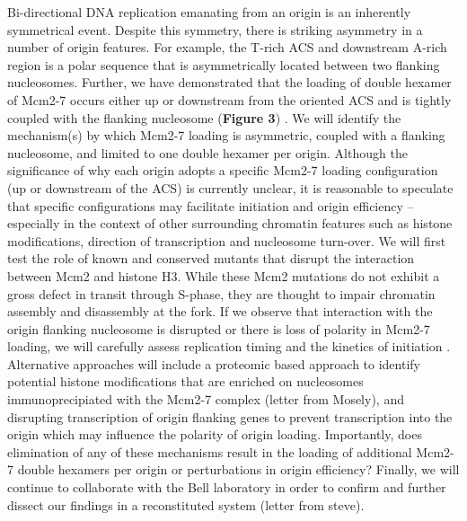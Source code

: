 Bi-directional DNA replication emanating from an origin is an inherently symmetrical event.  Despite this symmetry, there is striking asymmetry in a number of origin features.  For example, the T-rich ACS and downstream A-rich region is a polar sequence that is asymmetrically located between two flanking nucleosomes. Further, we have demonstrated that the loading of double hexamer of Mcm2-7 occurs either up or downstream from the oriented ACS and is tightly coupled with the flanking nucleosome ({\color{dukeblue}\textbf{Figure 3}}) \citep{Belsky2015}. We will identify the mechanism(s) by which Mcm2-7 loading is asymmetric, coupled with a flanking nucleosome, and limited to one double hexamer per origin.  Although the significance of why each origin adopts a specific Mcm2-7 loading configuration (up or downstream of the ACS) is currently unclear, it is reasonable to speculate that specific configurations may facilitate initiation and origin efficiency -- especially in the context of other surrounding chromatin features such as histone modifications, direction of transcription and nucleosome turn-over.  We will first test the role of known and conserved mutants that disrupt the interaction between Mcm2 and histone H3\citep{Huang2015-fk,Foltman2013-dk}.  While these Mcm2 mutations do not exhibit a gross defect in transit through S-phase, they are thought to impair chromatin assembly and disassembly at the fork\citep{Foltman2013-dk}.  If we observe that interaction with the origin flanking nucleosome is disrupted or there is loss of polarity in Mcm2-7 loading, we will carefully assess replication timing and the kinetics of initiation \invivo.  Alternative approaches will include a proteomic based approach to identify potential histone modifications that are enriched on nucleosomes immunoprecipiated with the Mcm2-7 complex (letter from Mosely), and disrupting transcription of origin flanking genes to prevent transcription into the origin which may influence the polarity of origin loading\citep{Gros2015-oo}.  Importantly, does elimination of any of these mechanisms result in the loading of additional Mcm2-7 double hexamers per origin or perturbations in origin efficiency? Finally, we will continue to collaborate with the Bell laboratory in order to confirm and further dissect our \invivo findings in a reconstituted system (letter from steve).  


